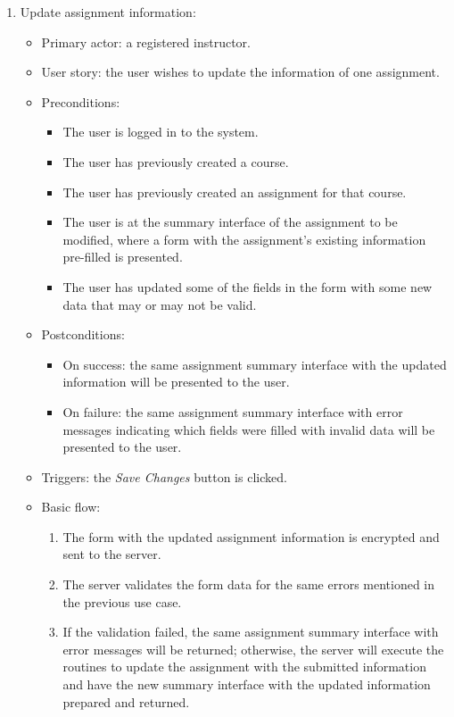 \begin{enumerate}
\item Update assignment information:
\begin{itemize}
    \item Primary actor: a registered instructor.
    \item User story: the user wishes to update the information of one
        assignment.
    \item Preconditions:
        \begin{itemize}
            \item The user is logged in to the system.
            \item The user has previously created a course.
            \item The user has previously created an assignment for that course.
            \item The user is at the summary interface of the assignment to be
                modified, where a form with the assignment's existing
                information pre-filled is presented.
            \item The user has updated some of the fields in the form with some
                new data that may or may not be valid.
        \end{itemize}
    \item Postconditions:
        \begin{itemize}
            \item On success: the same assignment summary interface with the updated
                information will be presented to the user.
            \item On failure: the same assignment summary interface with error
                messages indicating which fields were filled with invalid data will
                be presented to the user.
        \end{itemize}
    \item Triggers: the \emph{Save Changes} button is clicked.
    \item Basic flow:
        \begin{enumerate}
            \item The form with the updated assignment information is encrypted
                and sent to the server.
            \item The server validates the form data for the same errors
                mentioned in the previous use case.
            \item If the validation failed, the same assignment summary interface
                with error messages will be returned; otherwise, the server will
                execute the routines to update the assignment with the submitted
                information and have the new summary interface with the updated
                information prepared and returned.
        \end{enumerate}
\end{itemize}


\end{enumerate}
